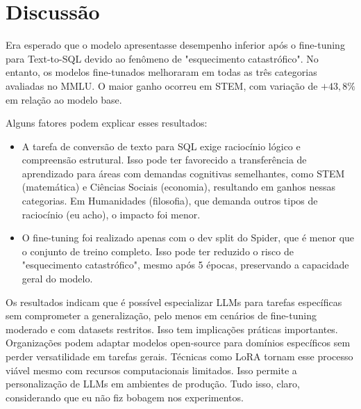 \documentclass[journal,onecolumn]{IEEEtran}
\begin{document}
\section{Discussão}
Era esperado que o modelo apresentasse desempenho inferior após o fine-tuning para Text-to-SQL devido ao fenômeno de "esquecimento catastrófico". No entanto, os modelos fine-tunados melhoraram em todas as três categorias avaliadas no MMLU. O maior ganho ocorreu em STEM, com variação de $+43,8\%$ em relação ao modelo base.

Alguns fatores podem explicar esses resultados:
\begin{itemize}
    \item A tarefa de conversão de texto para SQL exige raciocínio lógico e compreensão estrutural. Isso pode ter favorecido a transferência de aprendizado para áreas com demandas cognitivas semelhantes, como STEM (matemática) e Ciências Sociais (economia), resultando em ganhos nessas categorias. Em Humanidades (filosofia), que demanda outros tipos de raciocínio (eu acho), o impacto foi menor.
    \item O fine-tuning foi realizado apenas com o dev split do Spider, que é menor que o conjunto de treino completo. Isso pode ter reduzido o risco de "esquecimento catastrófico", mesmo após 5 épocas, preservando a capacidade geral do modelo.
\end{itemize}
Os resultados indicam que é possível especializar LLMs para tarefas específicas sem comprometer a generalização, pelo menos em cenários de fine-tuning moderado e com datasets restritos. Isso tem implicações práticas importantes. Organizações podem adaptar modelos open-source para domínios específicos sem perder versatilidade em tarefas gerais. Técnicas como LoRA tornam esse processo viável mesmo com recursos computacionais limitados. Isso permite a personalização de LLMs em ambientes de produção. Tudo isso, claro, considerando que eu não fiz bobagem nos experimentos.
\end{document}
